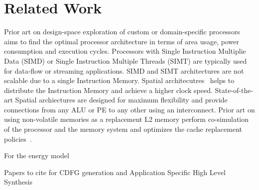 \section{Related Work}

Prior art on design-space exploration of custom or domain-specific processors~\cite{Jordans2014,EusseSAMOS2014,Jozwiak2013} aims to find the optimal processor architecture in terms of area usage, power consumption and execution cycles. Processors with Single Instruction Multiplie Data (SIMD) or Single Instruction Multiple Threads (SIMT) are typically used for data-flow or streaming applications. SIMD and SIMT architectures are not scalable due to a single Instruction Memory. Spatial architecutres~\cite{7284058,8686088} helps to distribute the Instruction Memory and achieve a higher clock speed. State-of-the-art Spatial archiectures are designed for maximum flexibility and provide connections from any ALU or PE to any other using an interconnect. Prior art on using non-volatile memories as a replacement L2 memory perform co-simulation of the processor and the memory system and optimizes the cache replacement policies~\cite{4798259,7092595,6271803,7360193,200116,Patel2016ReducingSL,Komalan:2014,Mittal13f}.

For the energy model~\cite{Yannan2019}

Papers to cite for CDFG generation and Application Specific High Level Synthesis~\cite{Coussy:2008:HSA:1457713,Kato2008}
